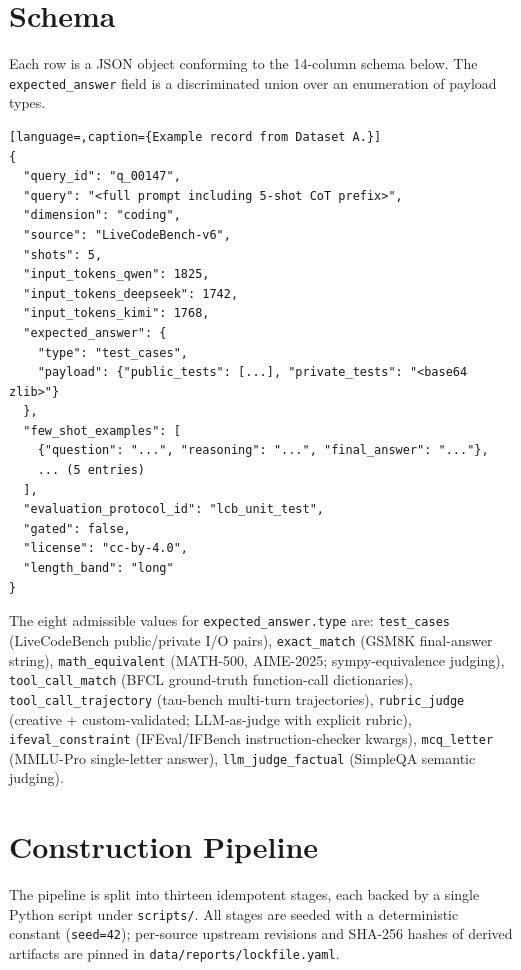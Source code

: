 \documentclass[11pt,a4paper]{article}
\begin{document}
\section{Schema}\label{sec:schema}

Each row is a JSON object conforming to the 14-column schema below. The \texttt{expected\_answer} field is a discriminated union over an enumeration of payload types.

\begin{lstlisting}[language=,caption={Example record from Dataset A.}]
{
  "query_id": "q_00147",
  "query": "<full prompt including 5-shot CoT prefix>",
  "dimension": "coding",
  "source": "LiveCodeBench-v6",
  "shots": 5,
  "input_tokens_qwen": 1825,
  "input_tokens_deepseek": 1742,
  "input_tokens_kimi": 1768,
  "expected_answer": {
    "type": "test_cases",
    "payload": {"public_tests": [...], "private_tests": "<base64 zlib>"}
  },
  "few_shot_examples": [
    {"question": "...", "reasoning": "...", "final_answer": "..."},
    ... (5 entries)
  ],
  "evaluation_protocol_id": "lcb_unit_test",
  "gated": false,
  "license": "cc-by-4.0",
  "length_band": "long"
}
\end{lstlisting}

The eight admissible values for \texttt{expected\_answer.type} are:
\texttt{test\_cases} (LiveCodeBench public/private I/O pairs),
\texttt{exact\_match} (GSM8K final-answer string),
\texttt{math\_equivalent} (MATH-500, AIME-2025; sympy-equivalence judging),
\texttt{tool\_call\_match} (BFCL ground-truth function-call dictionaries),
\texttt{tool\_call\_trajectory} (tau-bench multi-turn trajectories),
\texttt{rubric\_judge} (creative + custom-validated; LLM-as-judge with explicit rubric),
\texttt{ifeval\_constraint} (IFEval/IFBench instruction-checker kwargs),
\texttt{mcq\_letter} (MMLU-Pro single-letter answer),
\texttt{llm\_judge\_factual} (SimpleQA semantic judging).

\section{Construction Pipeline}\label{sec:pipeline}

The pipeline is split into thirteen idempotent stages, each backed by a single Python script under \texttt{scripts/}. All stages are seeded with a deterministic constant (\texttt{seed=42}); per-source upstream revisions and SHA-256 hashes of derived artifacts are pinned in \texttt{data/reports/lockfile.yaml}.
\end{document}
